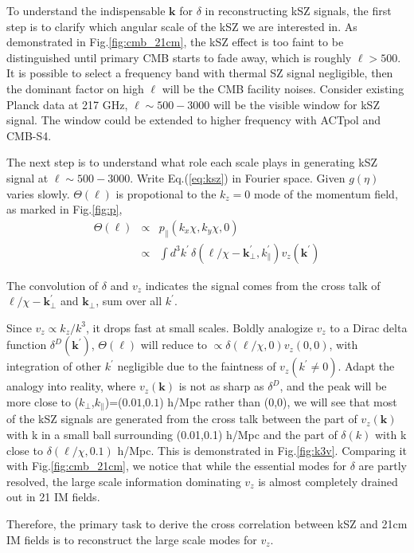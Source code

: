
To understand the indispensable $\bm{k}$ for $\delta$ 
in reconstructing kSZ signals, 
the first step is to clarify which angular scale of the kSZ  
we are interested in. 
As demonstrated in Fig.\ref{fig:cmb_21cm}, 
the kSZ effect is too faint to 
be distinguished until 
primary CMB starts to fade away, 
which is roughly $\ell>500$. 
It is possible to select a frequency band with thermal SZ signal negligible, 
then the dominant factor on high $\ell$ will be the CMB facility noises. 
Consider existing Planck \cite{Planck2015} data at 217 GHz, 
$\ell \sim 500-3000$ will be the visible window for kSZ signal. 
The window could be extended to higher frequency with 
ACTpol and CMB-S4. 


The next step is to understand what role each scale plays in generating kSZ signal 
at $\ell \sim 500-3000$. 
Write Eq.(\ref{eq:ksz}) in Fourier space. 
Given $g(\eta)$ varies slowly. 
$\Theta(\bm{\ell})$ is propotional to the $k_z=0$ mode of the momentum field, as marked in Fig.\ref{fig:p}, 
\begin{eqnarray}
    \label{eq:thetak}
    \Theta(\bm{\ell})&\propto&p_\parallel({k}_x\chi,{k}_y\chi,0)\\
    &\propto&\int 
    d^3k^\prime\,\delta(\bm{\ell}/\chi-\bm{k}_\perp^\prime,k_\parallel^\prime) v_z(\bm{k^\prime})\nonumber
    \end{eqnarray}

The convolution of $\delta$ and $v_z$ 
indicates the signal comes from the cross talk of 
$\bm{\ell}/\chi-\bm{k}_\perp^\prime$ and $\bm{k}_\perp$, 
sum over all $k^\prime$. 

Since $v_z \propto k_z/k^3$, 
it drops fast at small scales. 
Boldly analogize $v_z$ to a Dirac delta function $\delta^D(\bm{k}^\prime)$, 
$\Theta(\bm{\ell})$ will reduce to $\propto\delta(\bm{\ell}/\chi,0) v_z(0,0)$, 
with integration of other $k^\prime$ negligible due to the faintness of 
$v_z(k^\prime\neq0)$. 
Adapt the analogy into reality, 
where $v_z(\bm{k})$ 
is not as sharp as $\delta^D$, 
and the peak will be more close to 
($k_\perp$,$k_\parallel$)=($0.01$,$0.1$) h/Mpc 
rather than (0,0),
we will see  
that most of the kSZ signals are 
generated from the cross talk between the part of 
$v_z(\bm{k})$ with k in a small ball  
surrounding (0.01,0.1) h/Mpc 
and the part of $\delta(k)$ with k close to 
$\delta(\bm{\ell}/\chi,0.1)$ h/Mpc. 
This is demonstrated in Fig.\ref{fig:k3v}. 
Comparing it with Fig.\ref{fig:cmb_21cm}, 
we notice that while the 
essential modes for $\delta$ are partly resolved, 
the large scale information dominating $v_z$ is 
almost completely drained out in 21 IM fields.

Therefore, the primary task to derive the cross correlation 
between kSZ and 21cm IM fields is to reconstruct the 
large scale modes for $v_z$.
